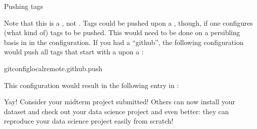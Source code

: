 \ignorespaces \begin{gitusernote}[label={index-19}, before title={\thetcbcounter\ }, check odd page=true]{Pushing tags}
\label{\detokenize{basics/101-130-yodaproject:index-19}}

\sphinxAtStartPar
Note that this is a , not .
Tags could be pushed upon a , though, if one
configures (what kind of) tags to be pushed. This would need to be done
on a per\sphinxhyphen{}sibling basis in  in the 
configuration. If you had a {\hyperref[\detokenize{glossary:term-sibling}]{}} “github”, the following
configuration would push all tags that start with a  upon a
:

\begin{sphinxVerbatim}[commandchars=\\\{\}]
gitconfig\PYGZhy{}\PYGZhy{}localremote.github.push
\end{sphinxVerbatim}

\sphinxAtStartPar
This configuration would result in the following entry in :

\begin{sphinxVerbatim}[commandchars=\\\{\}]
\end{sphinxVerbatim}


\end{gitusernote}

\sphinxAtStartPar
Yay! Consider your midterm project submitted! Others can now install your
dataset and check out your data science project \textendash{} and even better: they can
reproduce your data science project easily from scratch!

